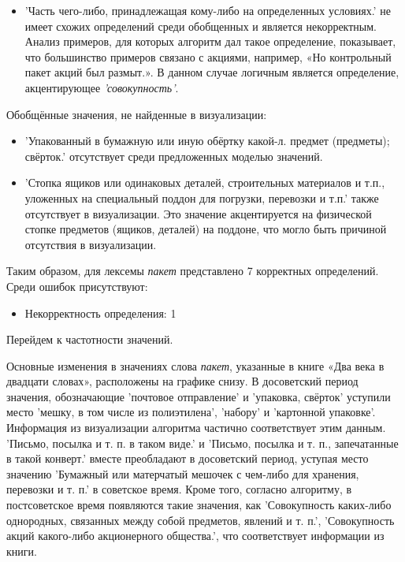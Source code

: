 \documentclass[LI,VKR]{HSEUniversity}
\begin{document}
\begin{itemize}
    \item ’Часть чего-либо, принадлежащая кому-либо на определенных условиях.’ не
имеет схожих определений среди обобщенных и является некорректным.
Анализ примеров, для которых алгоритм дал такое определение, показывает, что
большинство примеров связано с акциями, например, «Но контрольный пакет акций был размыт.».
В данном случае логичным является определение, акцентирующее \textit{’совокупность’}.
\end{itemize}

Обобщённые значения, не найденные в визуализации:
\begin{itemize}
    \item ’Упакованный в бумажную или иную обёртку какой-л. предмет (предметы); свёрток.’
отсутствует среди предложенных моделью значений.

    \item ’Стопка ящиков или одинаковых деталей, строительных материалов и т.п.,
уложенных на специальный поддон для погрузки, перевозки и т.п.’
также отсутствует в визуализации.
Это значение акцентируется на физической стопке предметов (ящиков, деталей) на поддоне,
что могло быть причиной отсутствия в визуализации.
\end{itemize}

Таким образом, для лексемы \textit{пакет} представлено 7 корректных определений.
Среди ошибок присутствуют:
\begin{itemize}
    \item Некорректность определения: 1
\end{itemize}

Перейдем к частотности значений.

Основные изменения в значениях слова \textit{пакет}, указанные в книге «Два века в двадцати словах»,
расположены на графике снизу.
В досоветский период значения, обозначающие ’почтовое отправление’ и ’упаковка, свёрток’
уступили место ’мешку, в том числе из полиэтилена’, ’набору’ и ’картонной упаковке’.
Информация из визуализации алгоритма частично соответствует этим данным.
’Письмо, посылка и т. п. в таком виде.’ и ’Письмо, посылка и т. п., запечатанные в такой конверт.’
вместе преобладают в досоветский период, уступая место значению
’Бумажный или матерчатый мешочек с чем-либо для хранения, перевозки и т. п.’ в советское время.
Кроме того, согласно алгоритму, в постсоветское время появляются такие значения, как
’Совокупность каких-либо однородных, связанных между собой предметов, явлений и т. п.’,
’Совокупность акций какого-либо акционерного общества.’,
что соответствует информации из книги.
\end{document}
